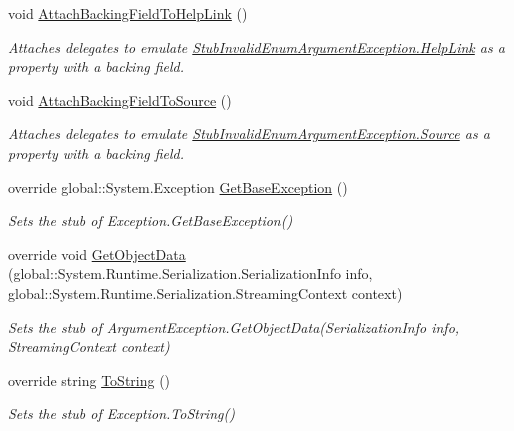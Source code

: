 \begin{DoxyCompactItemize}
void \hyperlink{class_system_1_1_component_model_1_1_fakes_1_1_stub_invalid_enum_argument_exception_a058708f67ce56a27b09df72be9955639}{Attach\-Backing\-Field\-To\-Help\-Link} ()
\begin{DoxyCompactList}\small\item\em Attaches delegates to emulate \hyperlink{class_system_1_1_component_model_1_1_fakes_1_1_stub_invalid_enum_argument_exception_acb0ed217e494e113842bc8106ae57de2}{Stub\-Invalid\-Enum\-Argument\-Exception.\-Help\-Link} as a property with a backing field.\end{DoxyCompactList}\item 
void \hyperlink{class_system_1_1_component_model_1_1_fakes_1_1_stub_invalid_enum_argument_exception_a658dcb31473c6cce6f0139b65dc2d1b5}{Attach\-Backing\-Field\-To\-Source} ()
\begin{DoxyCompactList}\small\item\em Attaches delegates to emulate \hyperlink{class_system_1_1_component_model_1_1_fakes_1_1_stub_invalid_enum_argument_exception_ad0679e9d206d9aa56fbcbde42ea32dd1}{Stub\-Invalid\-Enum\-Argument\-Exception.\-Source} as a property with a backing field.\end{DoxyCompactList}\item 
override global\-::\-System.\-Exception \hyperlink{class_system_1_1_component_model_1_1_fakes_1_1_stub_invalid_enum_argument_exception_acba4272ac5f2ba3b060be33fc0a5d63e}{Get\-Base\-Exception} ()
\begin{DoxyCompactList}\small\item\em Sets the stub of Exception.\-Get\-Base\-Exception()\end{DoxyCompactList}\item 
override void \hyperlink{class_system_1_1_component_model_1_1_fakes_1_1_stub_invalid_enum_argument_exception_a471f1f0259373d7f4fa5a1c3659d8b31}{Get\-Object\-Data} (global\-::\-System.\-Runtime.\-Serialization.\-Serialization\-Info info, global\-::\-System.\-Runtime.\-Serialization.\-Streaming\-Context context)
\begin{DoxyCompactList}\small\item\em Sets the stub of Argument\-Exception.\-Get\-Object\-Data(\-Serialization\-Info info, Streaming\-Context context)\end{DoxyCompactList}\item 
override string \hyperlink{class_system_1_1_component_model_1_1_fakes_1_1_stub_invalid_enum_argument_exception_adc261d38dbe1687718612bf7e12831f5}{To\-String} ()
\begin{DoxyCompactList}\small\item\em Sets the stub of Exception.\-To\-String()\end{DoxyCompactList}\end{DoxyCompactItemize}
